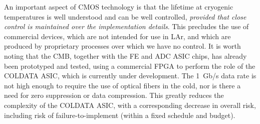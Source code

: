 An important aspect of CMOS technology is that the lifetime at cryogenic temperatures is well understood and can be
well controlled, {\em provided that close control is maintained over the implementation details}.
This precludes the use of commercial devices, which are not intended for use in LAr,
and which are produced by proprietary processes over which we have no control.
It is worth noting that the CMB, together with the FE and ADC ASIC chips, has already been prototyped and tested,
using a commercial FPGA to perform the role of the COLDATA ASIC,
which is currently under development.
The 1~Gb/s data rate is not high enough to require the use of optical fibers in the cold,
nor is there a need for zero suppression or data compression.
This greatly reduces the complexity of the COLDATA ASIC, with a corresponding decrease in overall risk,
including risk of failure-to-implement (within a fixed schedule and budget).

